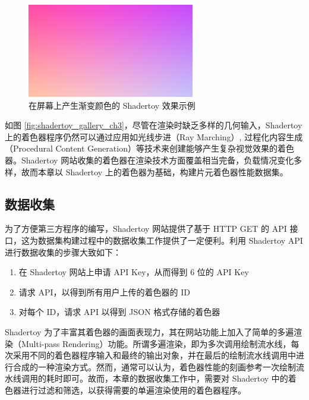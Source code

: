 \begin{figure}
  \centering
  \includegraphics[width=0.65\textwidth]{figures/example_shadertoy_output.png}
  \caption{在屏幕上产生渐变颜色的 Shadertoy 效果示例}
  \label{fig:example_shadertoy_output_ch3}
\end{figure}

如图 \ref{fig:shadertoy_gallery_ch3}，尽管在渲染时缺乏多样的几何输入，{\amend Shadertoy 上的着色器程序}仍然可以通过应用如光线步进（Ray Marching）\cite{Hart1996}, 过程化内容生成（Procedural Content Generation）等技术来创建能够产生复杂视觉效果的着色器。Shadertoy 网站收集的着色器在渲染技术方面覆盖相当完备，{\amend 负载情况变化多样}，故而{\amend 本章}以 Shadertoy 上的着色器为基础，构建片元着色器性能数据集。

\subsection{数据收集}

为了方便第三方程序的编写，Shadertoy 网站提供了基于 HTTP GET 的 API 接口，这为{\amend 数据集构建过程中的}数据收集工作提供了一定便利。利用 Shadertoy API 进行数据收集的步骤大致如下：

\begin{enumerate}
    \item 在 Shadertoy 网站上申请 API Key，从而得到 6 位的 API Key
    \item 请求 API，以得到所有用户上传的着色器的 ID
    \item 对每个 ID，请求 API 以得到 JSON 格式存储的着色器
\end{enumerate}

{\amend Shadertoy 为了丰富其着色器的画面表现力，其在网站功能上加入了简单的多遍渲染（Multi-pass Rendering）功能。所谓多遍渲染，即为多次调用绘制流水线，每次采用不同的着色器程序输入和最终的输出对象，并在最后的绘制流水线调用中进行合成的一种渲染方式。然而，通常可以认为，着色器性能的刻画参考一次绘制流水线调用的耗时即可。故而，本章的数据收集工作中，需要对 Shadertoy 中的着色器进行过滤和筛选，以获得需要的单遍渲染使用的着色器程序。}

